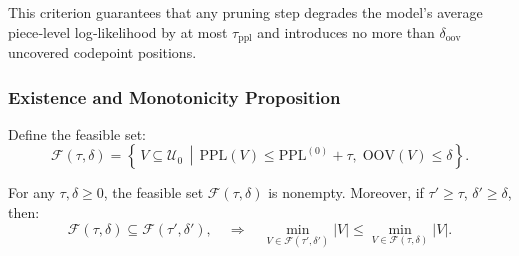 This criterion guarantees that any pruning step degrades the model’s average piece‐level log‐likelihood by at most \(\tau_{\mathrm{ppl}}\) and introduces no more than \(\delta_{\mathrm{oov}}\) uncovered codepoint positions.

\subsubsection{Existence and Monotonicity Proposition}

Define the feasible set:
\[
\mathcal F(\tau,\delta)
= \left\{\,V\subseteq\mathcal U_{0}\,\middle|\,
\mathrm{PPL}(V)\le \mathrm{PPL}^{(0)}+\tau,\;
\mathrm{OOV}(V)\le \delta
\right\}.
\]

\begin{proposition}
	For any \(\tau,\delta \ge 0\), the feasible set \(\mathcal F(\tau,\delta)\) is nonempty. Moreover, if \(\tau' \ge \tau\), \(\delta' \ge \delta\), then:
	\[
	\mathcal F(\tau,\delta) \subseteq \mathcal F(\tau',\delta'),
	\quad
	\Rightarrow
	\quad
	\min_{V\in\mathcal F(\tau',\delta')}|V| \le \min_{V\in\mathcal F(\tau,\delta)}|V|.
	\]
\end{proposition}

